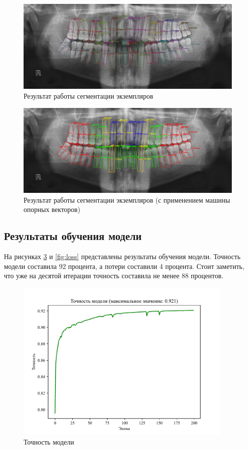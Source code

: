 \begin{figure}[H]
	\centering
	\includegraphics[width=\textwidth]{img/segmented_cca.png}
	\caption{Результат работы сегментации экземпляров}
	\label{fig:segmented_cca}
\end{figure}

\begin{figure}[H]
	\centering
	\includegraphics[width=\textwidth]{img/segmented_svm.png}
	\caption{Результат работы сегментации экземпляров (с применением машины опорных векторов)}
	\label{fig:segmented_svm}
\end{figure}

\subsection{Результаты обучения модели}

На рисунках \ref{fig:accuracy} и \ref{fig:loss} представлены результаты обучения модели. Точность модели составила 92 процента, а потери составили 4 процента. Стоит заметить, что уже на десятой итерации точность составила не менее 88 процентов.

\begin{figure}[H]
	\centering
	\includegraphics[width=400px]{img/accuracy.pdf}
	\caption{Точность модели}
	\label{fig:accuracy}
\end{figure}

